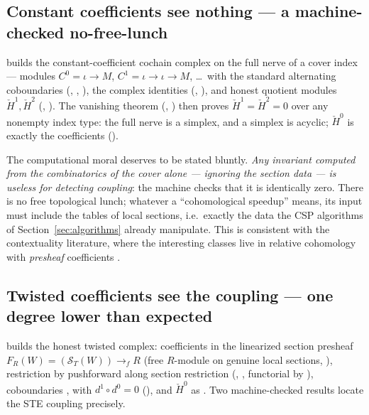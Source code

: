 \documentclass[11pt]{article}
\newcommand{\Sec}{\mathcal S}
\newcommand{\Hech}{\check H}
\begin{document}
\subsection{Constant coefficients see nothing --- a machine-checked
no-free-lunch}

 builds the constant-coefficient cochain
complex on the full nerve of a cover index --- modules $C^0 = \iota
\to M$, $C^1 = \iota \to \iota \to M$, \dots\ with the standard
alternating coboundaries (, ,
), the complex identities
(, ), and
honest quotient modules $\Hech^1, \Hech^2$ (,
).  The vanishing theorem
(, ) then proves
$\Hech^1 = \Hech^2 = 0$ over any nonempty index type: the full nerve
is a simplex, and a simplex is acyclic; $\Hech^0$ is exactly the
coefficients ().

The computational moral deserves to be stated bluntly.  \emph{Any
invariant computed from the combinatorics of the cover alone ---
ignoring the section data --- is useless for detecting coupling}: the
machine checks that it is identically zero.  There is no free
topological lunch; whatever a ``cohomological speedup'' means, its
input must include the tables of local sections, i.e.\ exactly the
data the CSP algorithms of
Section~\ref{sec:algorithms} already manipulate.  This is consistent
with the contextuality literature, where the interesting classes live
in relative cohomology with \emph{presheaf} coefficients
\citep{abramsky2012cohomology,caru2017cohomology}.

\subsection{Twisted coefficients see the coupling --- one degree lower
than expected}

 builds the honest twisted complex: coefficients
in the linearized section presheaf $F_R(W) = (\Sec_T(W)) \to_{\!f} R$
(free $R$-module on genuine local sections, ),
restriction by pushforward along section restriction
(, , functorial by
), coboundaries ,
 with $d^1 \circ d^0 = 0$
(), and $\Hech^0$ as .
Two machine-checked results locate the STE coupling precisely.
\end{document}
